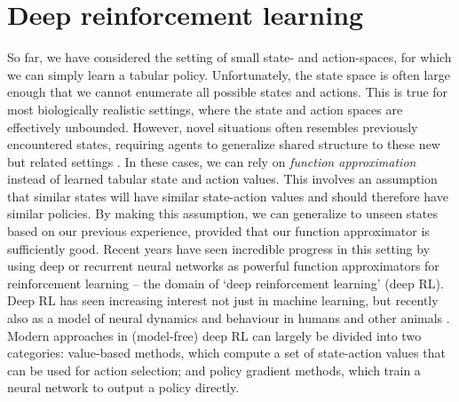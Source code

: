 \section{Deep reinforcement learning}
\label{sec:deep_RL}

So far, we have considered the setting of small state- and action-spaces, for which we can simply learn a tabular policy.
Unfortunately, the state space is often large enough that we cannot enumerate all possible states and actions.
This is true for most biologically realistic settings, where the state and action spaces are effectively unbounded.
However, novel situations often resembles previously encountered states, requiring agents to generalize shared structure to these new but related settings \citep{botvinick2020deep}.
In these cases, we can rely on \emph{function approximation} \citep{sutton2018reinforcement} instead of learned tabular state and action values.
This involves an assumption that similar states will have similar state-action values and should therefore have similar policies.
By making this assumption, we can generalize to unseen states based on our previous experience, provided that our function approximator is sufficiently good.
Recent years have seen incredible progress in this setting by using deep or recurrent neural networks as powerful function approximators for reinforcement learning -- the domain of `deep reinforcement learning' (deep RL).
Deep RL has seen increasing interest not just in machine learning, but recently also as a model of neural dynamics and behaviour in humans and other animals \citep{wang2018prefrontal, jensen2023recurrent, makino2023arithmetic, merel2019deep, banino2018vector,aldarondo2024virtual,botvinick2020deep}.
Modern approaches in (model-free) deep RL can largely be divided into two categories: value-based methods, which compute a set of state-action values that can be used for action selection; and policy gradient methods, which train a neural network to output a policy directly.




